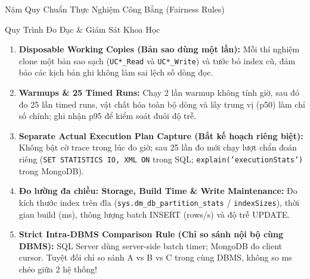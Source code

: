 \documentclass[aspectratio=169,9pt]{beamer}
\begin{document}
\begin{frame}{Năm Quy Chuẩn Thực Nghiệm Công Bằng (Fairness Rules)}
\begin{block}{Quy Trình Đo Đạc \& Giám Sát Khoa Học}
\begin{enumerate}
  \item \textbf{Disposable Working Copies (Bản sao dùng một lần):} Mỗi thí nghiệm clone một bản sao sạch (\texttt{UC*\_Read} và \texttt{UC*\_Write}) và tước bỏ index cũ, đảm bảo các kịch bản ghi không làm sai lệch số dòng đọc.
  \item \textbf{Warmups \& 25 Timed Runs:} Chạy 2 lần warmup không tính giờ, sau đó đo 25 lần timed runs, vật chất hóa toàn bộ dòng và lấy trung vị (p50) làm chỉ số chính; ghi nhận p95 để kiểm soát đuôi độ trễ.
  \item \textbf{Separate Actual Execution Plan Capture (Bắt kế hoạch riêng biệt):} Không bật cờ trace trong lúc đo giờ; sau 25 lần đo mới chạy lượt chẩn đoán riêng (\texttt{SET STATISTICS IO, XML ON} trong SQL; \texttt{explain('executionStats')} trong MongoDB).
  \item \textbf{Đo lường đa chiều: Storage, Build Time \& Write Maintenance:} Đo kích thước index trên đĩa (\texttt{sys.dm\_db\_partition\_stats} / \texttt{indexSizes}), thời gian build (ms), thông lượng batch INSERT (rows/s) và độ trễ UPDATE.
  \item \textbf{Strict Intra-DBMS Comparison Rule (Chỉ so sánh nội bộ cùng DBMS):} SQL Server dùng server-side batch timer; MongoDB đo client cursor. Tuyệt đối chỉ so sánh A vs B vs C trong cùng DBMS, không so ms chéo giữa 2 hệ thống!
\end{enumerate}
\end{block}
\end{frame}
\end{document}
